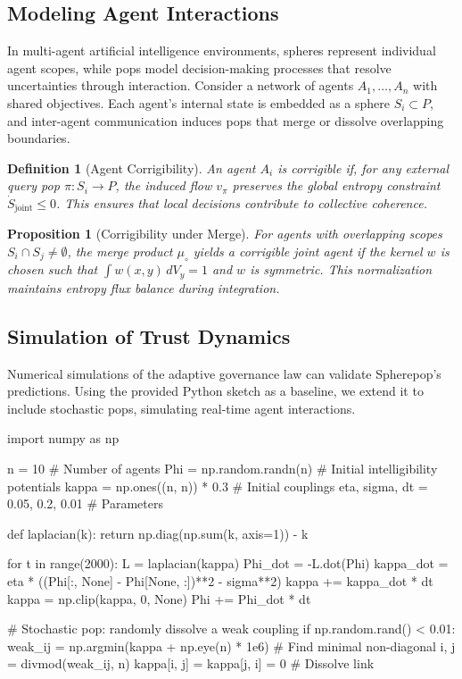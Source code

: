 \documentclass[12pt]{article}
\newtheorem{definition}{Definition}
\newtheorem{proposition}{Proposition}
\begin{document}
\subsection{Modeling Agent Interactions}
In multi-agent artificial intelligence environments, spheres represent individual agent scopes, while pops model decision-making processes that resolve uncertainties through interaction. Consider a network of agents \(A_1, \dots, A_n\) with shared objectives. Each agent's internal state is embedded as a sphere \(S_i \subset P\), and inter-agent communication induces pops that merge or dissolve overlapping boundaries.

\begin{definition}[Agent Corrigibility]
An agent \(A_i\) is \emph{corrigible} if, for any external query pop \(\pi: S_i \to P\), the induced flow \(v_\pi\) preserves the global entropy constraint \(\dot S_{\text{joint}} \leq 0\). This ensures that local decisions contribute to collective coherence.
\end{definition}

\begin{proposition}[Corrigibility under Merge]
For agents with overlapping scopes \(S_i \cap S_j \neq \emptyset\), the merge product \(\mu_\circ\) yields a corrigible joint agent if the kernel \(w\) is chosen such that \(\int w(x,y) \, dV_y = 1\) and \(w\) is symmetric. This normalization maintains entropy flux balance during integration.
\end{proposition}

\subsection{Simulation of Trust Dynamics}
Numerical simulations of the adaptive governance law can validate Spherepop's predictions. Using the provided Python sketch as a baseline, we extend it to include stochastic pops, simulating real-time agent interactions.

\begin{codeblock}
import numpy as np

n = 10  # Number of agents
Phi = np.random.randn(n)  # Initial intelligibility potentials
kappa = np.ones((n, n)) * 0.3  # Initial couplings
eta, sigma, dt = 0.05, 0.2, 0.01  # Parameters

def laplacian(k):
    return np.diag(np.sum(k, axis=1)) - k

for t in range(2000):
    L = laplacian(kappa)
    Phi_dot = -L.dot(Phi)
    kappa_dot = eta * ((Phi[:, None] - Phi[None, :])**2 - sigma**2)
    kappa += kappa_dot * dt
    kappa = np.clip(kappa, 0, None)
    Phi += Phi_dot * dt
    
    # Stochastic pop: randomly dissolve a weak coupling
    if np.random.rand() < 0.01:
        weak_ij = np.argmin(kappa + np.eye(n) * 1e6)  # Find minimal non-diagonal
        i, j = divmod(weak_ij, n)
        kappa[i, j] = kappa[j, i] = 0  # Dissolve link
\end{codeblock}
\end{document}
